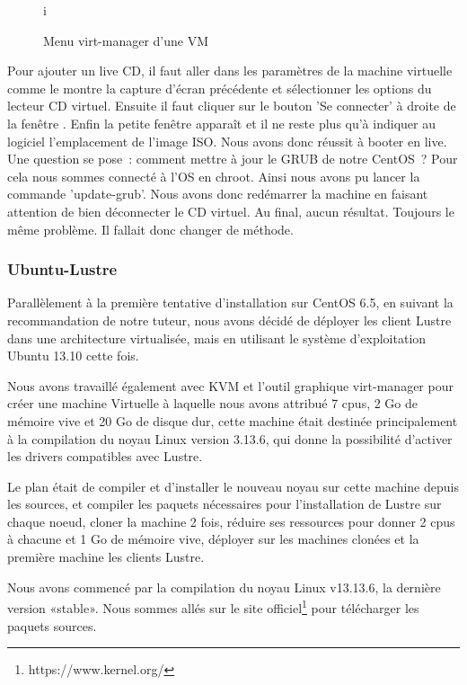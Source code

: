 \documentclass[12pt]{article}
\begin{document}
\begin{figure}[H]
\caption{Menu virt-manager d'une VM}
\label{fig:identification}
i\end{figure}

Pour ajouter un live CD, il faut aller dans les paramètres de la machine virtuelle comme le montre la capture d'écran précédente et sélectionner les options du lecteur CD virtuel. Ensuite il faut cliquer sur le bouton 'Se connecter' à droite de la fenêtre . Enfin la petite fenêtre apparaît et il ne reste plus qu'à indiquer au logiciel l'emplacement de l'image ISO. Nous avons donc réussit à booter en live. Une question se pose : comment mettre à jour le GRUB de notre CentOS ? Pour cela nous sommes connecté à l'OS en chroot. Ainsi nous avons pu lancer la commande 'update-grub'. Nous avons donc redémarrer la machine en faisant attention de bien déconnecter le CD virtuel. Au final, aucun résultat. Toujours le même problème. Il fallait donc changer de méthode.

\newpage
\subsubsection{Ubuntu-Lustre}
Parallèlement à la première tentative d'installation sur CentOS 6.5, en suivant la recommandation de notre tuteur, nous avons décidé de déployer les client Lustre dans une architecture virtualisée, mais en utilisant le système d'exploitation Ubuntu 13.10 cette fois.

Nous avons travaillé également avec KVM et l'outil graphique virt-manager pour créer une machine Virtuelle à laquelle nous avons attribué 7 cpus, 2 Go de mémoire vive et 20 Go de disque dur, cette machine était destinée principalement à la compilation du noyau Linux version 3.13.6, qui donne la possibilité d'activer les drivers compatibles avec Lustre.

Le plan était de compiler et d'installer le nouveau noyau sur cette machine depuis les sources, et compiler les paquets nécessaires pour l'installation de Lustre sur chaque noeud, cloner la machine 2 fois, réduire ses ressources pour donner 2 cpus à chacune et 1 Go de mémoire vive, déployer sur les machines clonées et la première machine les clients Lustre.

Nous avons commencé par la compilation du noyau Linux v13.13.6, la dernière version «stable». Nous sommes allés sur le site officiel\footnote{https://www.kernel.org/} pour télécharger les paquets sources.
\end{document}
